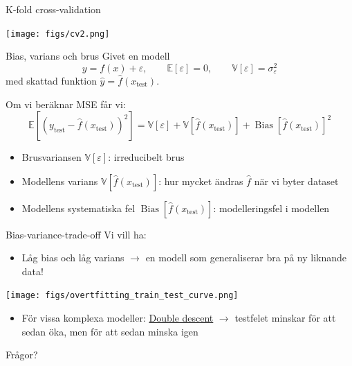 \documentclass[10pt,english]{beamer}
\begin{document}
\begin{frame}{K-fold cross-validation}
    \begin{center}
        \texttt{[image: figs/cv2.png]}
    \end{center}
\end{frame}

\begin{frame}{Bias, varians och brus}
    Givet en modell
    \begin{equation*}
        y = f(x) + \varepsilon, \qquad \mathbb{E}[\varepsilon] = 0, \qquad \mathbb{V}[\varepsilon] = \sigma^2_{\varepsilon}
    \end{equation*}
    med skattad funktion $\hat{y} = \hat{f}(x_{\text{test}})$.

    Om vi beräknar MSE får vi:
    \begin{equation*}
        \mathbb{E}\left[ \left( y_{\text{test}} - \hat{f}(x_{\text{test}}) \right)^2 \right] = \mathbb{V}[\varepsilon] + \mathbb{V}\left[\hat{f}(x_{\text{test}})\right] + \operatorname{Bias}\left[\hat{f}(x_{\text{test}})\right]^2
    \end{equation*}
    \begin{itemize}
        \item Brusvariansen $\mathbb{V}[\varepsilon]$: irreducibelt brus
        \item Modellens varians $\mathbb{V}[\hat{f}(x_{\text{test}})]$: hur mycket ändras $\hat{f}$ när vi byter dataset
        \item Modellens systematiska fel $\operatorname{Bias}[\hat{f}(x_{\text{test}})]$: modelleringsfel i modellen
    \end{itemize}
\end{frame}

\begin{frame}{Bias-variance-trade-off}
    Vi vill ha:
    \begin{itemize}
        \item Låg bias och låg varians $\rightarrow$ en modell som generaliserar bra på ny liknande data!
    \end{itemize}
    
    \texttt{[image: figs/overtfitting\_train\_test\_curve.png]}

    \begin{itemize}
      \item För vissa komplexa modeller: \href{https://en.wikipedia.org/wiki/Double_descent}{Double descent} $\rightarrow$ testfelet minskar för att sedan öka, men för att sedan minska igen
    \end{itemize}
    
\end{frame}



\begin{frame}{Frågor?}
    
\end{frame}
\end{document}
